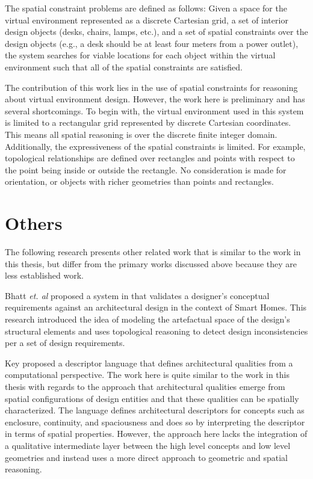 \documentclass[12pt]{ucthesis}
\begin{document}
The spatial constraint problems are defined as follows: Given a space for the virtual environment represented as a discrete Cartesian grid, a set of interior design objects (desks, chairs, lamps, etc.), and a set of spatial constraints over the design objects (e.g., a desk should be at least four meters from a power outlet), the system searches for viable locations for each object within the virtual environment such that all of the spatial constraints are satisfied. 

The contribution of this work lies in the use of spatial constraints for reasoning about virtual environment design. However, the work here is preliminary and has several shortcomings. To begin with, the virtual environment used in this system is limited to a rectangular grid represented by discrete Cartesian coordinates. This means all spatial reasoning is over the discrete finite integer domain. Additionally, the expressiveness of the spatial constraints is limited. For example, topological relationships are defined over rectangles and points with respect to the point being inside or outside the rectangle. No consideration is made for orientation, or objects with richer geometries than points and rectangles.

\section{Others}
The following research presents other related work that is similar to the work in this thesis, but differ from the primary works discussed above because they are less established work.

Bhatt \emph{et. al} proposed a system in \cite{BhattDH09} that validates a designer's conceptual requirements against an architectural design in the context of Smart Homes. This research introduced the idea of modeling the artefactual space of the design's structural elements and uses topological reasoning to detect design inconsistencies per a set of design requirements.

Key proposed a descriptor language \cite{Key} that defines architectural qualities from a computational perspective. The work here is quite similar to the work in this thesis with regards to the approach that architectural qualities emerge from spatial configurations of design entities and that these qualities can be spatially characterized. The language defines architectural descriptors for concepts such as enclosure, continuity, and spaciousness and does so by interpreting the descriptor in terms of spatial properties. However, the approach here lacks the integration of a qualitative intermediate layer between the high level concepts and low level geometries and instead uses a more direct approach to geometric and spatial reasoning.
\end{document}
